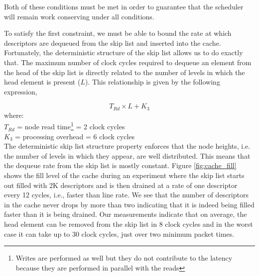 Both of these conditions must be met in order to guarantee that the scheduler will remain work conserving under all conditions. 

To satisfy the first constraint, we must be able to bound the rate at which descriptors are dequeued from the skip list and inserted into the cache. Fortunately, the deterministic structure of the skip list allows us to do exactly that. The maximum number of clock cycles required to dequeue an element from the head of the skip list is directly related to the number of levels in which the head element is present ($L$). This relationship is given by the following expression,

\begin{equation}\label{worst-case-remove_eqn}
T_{Rd} \times L + K_{3}
\end{equation}
where:\\
\indent $T_{Rd}$ = node read time\footnote{Writes are performed as well but they do not contribute to the latency because they are performed in parallel with the reads} = 2 clock cycles\\
\indent $K_{3}$ = processing overhead = 6 clock cycles\\

The deterministic skip list structure property enforces that the node heights, i.e. the number of levels in which they appear, are well distributed. This means that the dequeue rate from the skip list is mostly constant. Figure \ref{fig:cache_fill} shows the fill level of the cache during an experiment where the skip list starts out filled with 2K descriptors and is then drained at a rate of one descriptor every 12 cycles, i.e., faster than line rate. We see that the number of descriptors in the cache never drops by more than two indicating that it is indeed being filled faster than it is being drained. Our measurements indicate that on average, the head element can be removed from the skip list in 8 clock cycles and in the worst case it can take up to 30 clock cycles, just over two minimum packet times.

